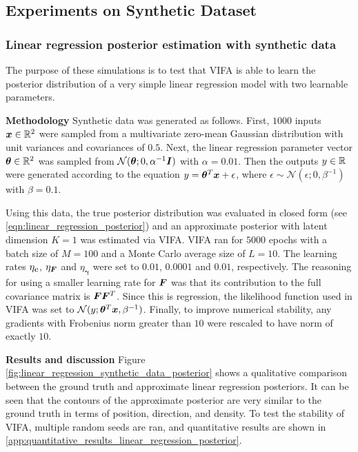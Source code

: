 \documentclass[10pt]{article} %
\newcommand{\vgamma}{\bm{\gamma}}
\begin{document}
\subsection{Experiments on Synthetic Dataset}
\subsubsection{Linear regression posterior estimation with synthetic data}
\label{sec:linear_regression_synthetic_data_posterior_methodology}
The purpose of these simulations is to test that VIFA is able to learn the posterior distribution of a very simple linear regression model with two learnable parameters.

\textbf{Methodology} Synthetic data was generated as follows. First, $1000$ inputs ${\bm{x}} \in \mathbb{R}^2$ were sampled from a multivariate zero-mean Gaussian distribution with unit variances and covariances of $0.5$. Next, the linear regression parameter vector ${\bm{\theta}} \in \mathbb{R}^2$ was sampled from $\mathcal{N} ( {\bm{\theta}} ; 0, \alpha^{-1} {\bm{I}})$ with $\alpha = 0.01$. Then the outputs $y \in \mathbb{R}$ were generated according to the equation $y = {\bm{\theta}}^T {\bm{x}} + \epsilon$, where $\epsilon \sim \mathcal{N} ( \epsilon ; 0, \beta^{-1})$ with $\beta = 0.1$.

Using this data, the true posterior distribution was evaluated in closed form (see \ref{eqn:linear_regression_posterior}) and an approximate posterior with latent dimension $K=1$ was estimated via VIFA. VIFA ran for $5000$ epochs with a batch size of $M=100$ and a Monte Carlo average size of $L=10$.  The learning rates $\eta_{\bm{c}}$,  $\eta_{\bm{F}}$ and $\eta_{\vgamma}$ were set to $0.01$, $0.0001$ and $0.01$, respectively. The reasoning for using a smaller learning rate for ${\bm{F}}$ was that its contribution to the full covariance matrix is ${\bm{F}}{\bm{F}}^T$. Since this is regression, the likelihood function used in VIFA was set to $\mathcal{N} (y; {\bm{\theta}}^T {\bm{x}}, \beta^{-1})$. Finally, to improve numerical stability, any gradients with Frobenius norm greater than $10$ were rescaled to have norm of exactly $10$.

\textbf{Results and discussion} Figure \ref{fig:linear_regression_synthetic_data_posterior} shows a qualitative comparison between the ground truth and approximate linear regression posteriors. It can be seen that the contours of the approximate posterior are very similar to the ground truth in terms of position, direction, and density. To test the stability of VIFA, multiple random seeds are ran, and quantitative results are shown in \ref{app:quantitative_results_linear_regression_posterior}.
\end{document}
